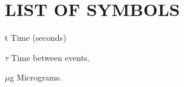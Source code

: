 \chapter*{LIST OF SYMBOLS}
%

\begin{symbollist}[0.7in]

\item[t]      Time (seconds)
\item[$\tau$] Time between events.
\item[$\mu$g] Micrograms.

\end{symbollist}